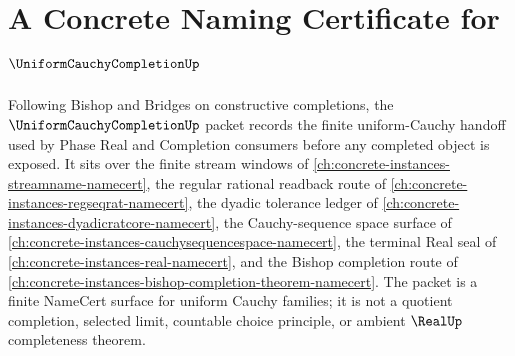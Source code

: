 \chapter{A Concrete Naming Certificate for $\UniformCauchyCompletionUp$}
\label{ch:concrete-instances-uniform-cauchy-completion-namecert}

Following Bishop and Bridges on constructive completions, the $\UniformCauchyCompletionUp$ packet records the finite uniform-Cauchy handoff used by Phase Real and Completion consumers before any completed object is exposed. It sits over the finite stream windows of \autoref{ch:concrete-instances-streamname-namecert}, the regular rational readback route of \autoref{ch:concrete-instances-regseqrat-namecert}, the dyadic tolerance ledger of \autoref{ch:concrete-instances-dyadicratcore-namecert}, the Cauchy-sequence space surface of \autoref{ch:concrete-instances-cauchysequencespace-namecert}, the terminal Real seal of \autoref{ch:concrete-instances-real-namecert}, and the Bishop completion route of \autoref{ch:concrete-instances-bishop-completion-theorem-namecert}. The packet is a finite NameCert surface for uniform Cauchy families; it is not a quotient completion, selected limit, countable choice principle, or ambient $\RealUp$ completeness theorem.

